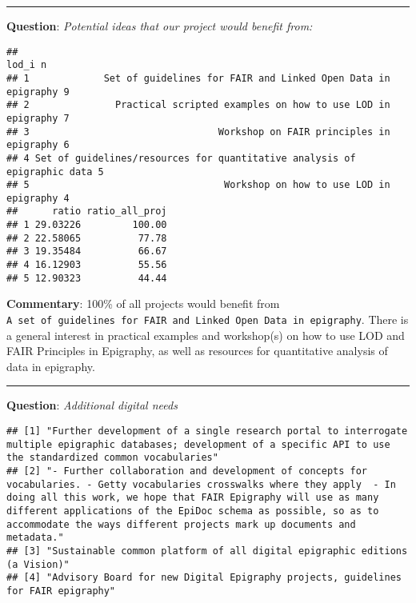 \documentclass[
]{article}
\begin{document}
\begin{center}\rule{0.5\linewidth}{0.5pt}\end{center}

\textbf{Question}: \emph{Potential ideas that our project would benefit
from:}

\begin{verbatim}
##                                                                      lod_i n
## 1             Set of guidelines for FAIR and Linked Open Data in epigraphy 9
## 2               Practical scripted examples on how to use LOD in epigraphy 7
## 3                                 Workshop on FAIR principles in epigraphy 6
## 4 Set of guidelines/resources for quantitative analysis of epigraphic data 5
## 5                                  Workshop on how to use LOD in epigraphy 4
##      ratio ratio_all_proj
## 1 29.03226         100.00
## 2 22.58065          77.78
## 3 19.35484          66.67
## 4 16.12903          55.56
## 5 12.90323          44.44
\end{verbatim}

\textbf{Commentary}: 100\% of all projects would benefit from
\texttt{A\ set\ of\ guidelines\ for\ FAIR\ and\ Linked\ Open\ Data\ in\ epigraphy}.
There is a general interest in practical examples and workshop(s) on how
to use LOD and FAIR Principles in Epigraphy, as well as resources for
quantitative analysis of data in epigraphy.

\begin{center}\rule{0.5\linewidth}{0.5pt}\end{center}

\textbf{Question}: \emph{Additional digital needs}

\begin{verbatim}
## [1] "Further development of a single research portal to interrogate multiple epigraphic databases; development of a specific API to use the standardized common vocabularies"                                                                                                                                                                 
## [2] "- Further collaboration and development of concepts for vocabularies. - Getty vocabularies crosswalks where they apply  - In doing all this work, we hope that FAIR Epigraphy will use as many different applications of the EpiDoc schema as possible, so as to accommodate the ways different projects mark up documents and metadata."
## [3] "Sustainable common platform of all digital epigraphic editions (a Vision)"                                                                                                                                                                                                                                                               
## [4] "Advisory Board for new Digital Epigraphy projects, guidelines for FAIR epigraphy"
\end{verbatim}
\end{document}
